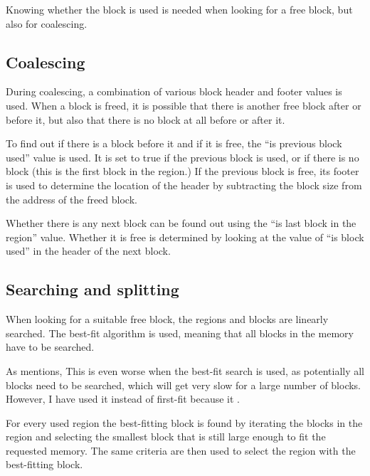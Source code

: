 \documentclass{article}
\begin{document}
Knowing whether the block is used is needed when looking for a free block, but also for coalescing.

\subsection{Coalescing}

During coalescing, a combination of various block header and footer values is used. When a block is freed, it is possible that there is another free block after or before it, but also that there is no block at all before or after it.

To find out if there is a block before it and if it is free, the ``is previous block used'' value is used. It is set to true if the previous block is used, or if there is no block (this is the first block in the region.) If the previous block is free, its footer is used to determine the location of the header by subtracting the block size from the address of the freed block.

Whether there is any next block can be found out using the ``is last block in the region'' value. Whether it is free is determined by looking at the value of ``is block used'' in the header of the next block.

\subsection{Searching and splitting}

When looking for a suitable free block, the regions and blocks are linearly searched. The best-fit algorithm is used, meaning that all blocks in the memory have to be searched.

As \cite{Wilson95dynamicstorage} mentions,  This is even worse when the best-fit search is used, as potentially all blocks need to be searched, which will get very slow for a large number of blocks. However, I have used it instead of first-fit because it  \cite{Wilson95dynamicstorage}.

For every used region the best-fitting block is found by iterating the blocks in the region and selecting the smallest block that is still large enough to fit the requested memory. The same criteria are then used to select the region with the best-fitting block.
\end{document}
